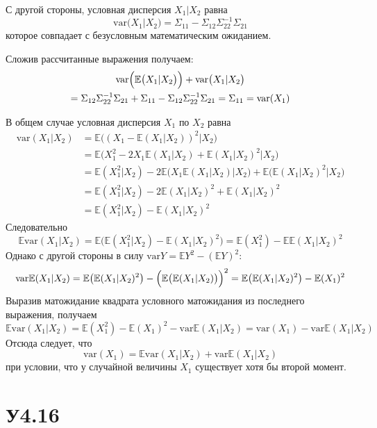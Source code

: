 \documentclass[a4paper]{article}
\newcommand{\ex}[0]{{\mathbb{E}}}
\newcommand{\var}[0]{\text{var}}
\begin{document}
С другой стороны, условная дисперсия $X_1 \rvert X_2$ равна
\[\var\bigl( X_1 \rvert X_2 \bigr) = \Sigma_{11} - \Sigma_{12} \Sigma_{22}^{-1} \Sigma_{21}\]
которое совпадает с безусловным математическим ожиданием.

Сложив рассчитанные выражения получаем:
\begin{multline*}
\var\Bigl(\ex\bigl( X_1 \rvert X_2 \bigr)\Bigr) + \var\bigl( X_1 \rvert X_2 \bigr)\\
= \Sigma_{12} \Sigma_{22}^{-1} \Sigma_{21} + \Sigma_{11} - \Sigma_{12} \Sigma_{22}^{-1} \Sigma_{21}
= \Sigma_{11}
= \var(X_1)
\end{multline*}

В общем случае условная дисперсия $X_1$ по $X_2$ равна
\begin{align*}
	\var(X_1 \lvert X_2)
	&= \ex\bigl( (X_1 - \ex(X_1 \lvert X_2))^2 \big\lvert X_2\bigr) \\
	&= \ex\bigl( X_1^2 - 2 X_1\ex(X_1 \lvert X_2) + \ex(X_1 \lvert X_2)^2 \big\lvert X_2\bigr) \\
	&= \ex( X_1^2 \lvert X_2) - 2 \ex\bigl( X_1 \ex(X_1 \lvert X_2) \big\lvert X_2\bigr) + \ex\bigl( \ex(X_1 \lvert X_2)^2 \big\lvert X_2\bigr) \\
	&= \ex( X_1^2 \lvert X_2) - 2 \ex(X_1 \lvert X_2)^2 + \ex(X_1 \lvert X_2)^2 \\
	&= \ex( X_1^2 \lvert X_2) - \ex(X_1 \lvert X_2)^2
\end{align*}
Следовательно
\[
\ex \var(X_1 \lvert X_2)
= \ex\bigl( \ex( X_1^2 \lvert X_2) - \ex(X_1 \lvert X_2)^2 \bigr)
= \ex(X_1^2) - \ex \ex(X_1 \lvert X_2)^2
\]
Однако с другой стороны в силу $\var{Y} = \ex Y^2 - (\ex Y )^2$:
\[
\var \ex(X_1 \lvert X_2)
= \ex \bigl(\ex(X_1 \lvert X_2)^2\bigr) - \Bigl(\ex \bigl(\ex(X_1 \lvert X_2)\bigr)\Bigr)^2
= \ex \bigl(\ex(X_1 \lvert X_2)^2\bigr) - \ex(X_1)^2
\]
Выразив матожидание квадрата условного матожидания из последнего выражения, получаем
\[
\ex \var(X_1 \lvert X_2)
= \ex(X_1^2) - \ex(X_1)^2 - \var \ex(X_1 \lvert X_2)
= \var(X_1) - \var \ex(X_1 \lvert X_2)
\]
Отсюда следует, что
\[\var(X_1) = \ex \var(X_1 \lvert X_2) + \var \ex(X_1 \lvert X_2)\]
при условии, что у случайной величины $X_1$ существует хотя бы второй момент.


\section{У4.16} %
\label{sec:problem_4_16}
\end{document}
